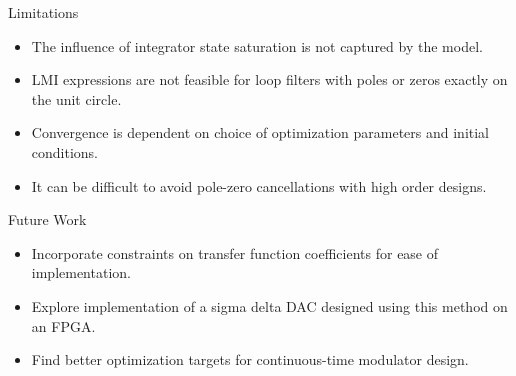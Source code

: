 \documentclass[10pt,usenames,dvipsnames]{beamer}
\begin{document}
\begin{frame}{Limitations}

\begin{itemize}
	\item The influence of integrator state saturation is not captured by the model.
	\item LMI expressions are not feasible for loop filters with poles or zeros exactly on the unit circle.
	\item Convergence is dependent on choice of optimization parameters and initial conditions.
	\item It can be difficult to avoid pole-zero cancellations with high order designs.
\end{itemize}

\end{frame}

\begin{frame}{Future Work}

\begin{itemize}
	\item Incorporate constraints on transfer function coefficients for ease of implementation.
	\item Explore implementation of a sigma delta DAC designed using this method on an FPGA.
	\item Find better optimization targets for continuous-time modulator design.
\end{itemize}

\end{frame}
\end{document}

